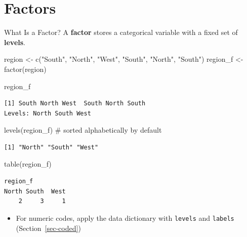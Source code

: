 \documentclass[
  ignorenonframetext,
  aspectratio=169,
]{beamer}
\newenvironment{Shaded}{\begin{snugshade}}{\end{snugshade}}
\newcommand{\CommentTok}[1]{\textcolor[rgb]{0.37,0.37,0.37}{#1}}
\newcommand{\FunctionTok}[1]{\textcolor[rgb]{0.28,0.35,0.67}{#1}}
\newcommand{\NormalTok}[1]{\textcolor[rgb]{0.00,0.23,0.31}{#1}}
\newcommand{\OtherTok}[1]{\textcolor[rgb]{0.00,0.23,0.31}{#1}}
\newcommand{\StringTok}[1]{\textcolor[rgb]{0.13,0.47,0.30}{#1}}
\providecommand{\tightlist}{%
  \setlength{\itemsep}{0pt}\setlength{\parskip}{0pt}}\usepackage{longtable,booktabs,array}
\begin{document}
\hypertarget{sec-factors}{%
\section{Factors}\label{sec-factors}}

\begin{frame}[fragile]{What Is a Factor?}
\protect\hypertarget{what-is-a-factor}{}
A \textbf{factor} stores a categorical variable with a fixed set of
\textbf{levels}.

\begin{Shaded}
\begin{Highlighting}[]
\NormalTok{region }\OtherTok{\textless{}{-}} \FunctionTok{c}\NormalTok{(}\StringTok{"South"}\NormalTok{, }\StringTok{"North"}\NormalTok{, }\StringTok{"West"}\NormalTok{, }\StringTok{"South"}\NormalTok{, }\StringTok{"North"}\NormalTok{, }\StringTok{"South"}\NormalTok{)}
\NormalTok{region\_f }\OtherTok{\textless{}{-}} \FunctionTok{factor}\NormalTok{(region)}

\NormalTok{region\_f}
\end{Highlighting}
\end{Shaded}

\begin{verbatim}
[1] South North West  South North South
Levels: North South West
\end{verbatim}

\begin{Shaded}
\begin{Highlighting}[]
\FunctionTok{levels}\NormalTok{(region\_f)        }\CommentTok{\# sorted alphabetically by default}
\end{Highlighting}
\end{Shaded}

\begin{verbatim}
[1] "North" "South" "West" 
\end{verbatim}

\begin{Shaded}
\begin{Highlighting}[]
\FunctionTok{table}\NormalTok{(region\_f)}
\end{Highlighting}
\end{Shaded}

\begin{verbatim}
region_f
North South  West 
    2     3     1 
\end{verbatim}

\begin{itemize}
\tightlist
\item
  For numeric codes, apply the data dictionary with \texttt{levels} and
  \texttt{labels} (Section~\ref{sec-coded})
\end{itemize}
\end{frame}
\end{document}
